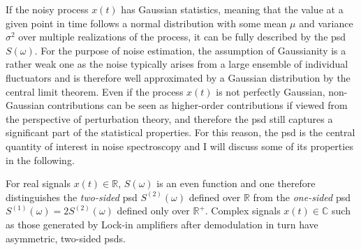 If the noisy process $x(t)$ has Gaussian statistics, meaning that the value at a given point in time follows a normal distribution with some mean $\mu$ and variance $\sigma^2$ over multiple realizations of the process, it can be fully described by the \gls{psd} $S(\omega)$.
For the purpose of noise estimation, the assumption of Gaussianity is a rather weak one as the noise typically arises from a large ensemble of individual fluctuators and is therefore well approximated by a Gaussian distribution by the central limit theorem.
Even if the process $x(t)$ is not perfectly Gaussian, non-Gaussian contributions can be seen as higher-order contributions if viewed from the perspective of perturbation theory, and therefore the \gls{psd} still captures a significant part of the statistical properties.
For this reason, the \gls{psd} is the central quantity of interest in noise spectroscopy and I will discuss some of its properties in the following.

For real signals $x(t) \in\mathbb{R}$, $S(\omega)$ is an even function and one therefore distinguishes the \emph{two-sided} \gls{psd} $S^{(2)}(\omega)$ defined over $\mathbb{R}$ from the \emph{one-sided} \gls{psd} $S^{(1)}(\omega) = 2 S^{(2)}(\omega)$ defined only over $\mathbb{R}^+$.
Complex signals $x(t)\in\mathbb{C}$ such as those generated by Lock-in amplifiers after demodulation in turn have asymmetric, two-sided \glspl{psd}.

